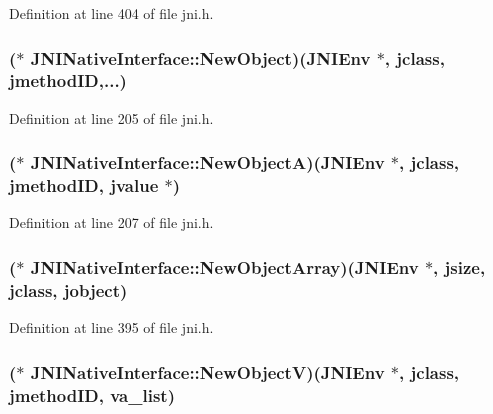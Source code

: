 Definition at line 404 of file jni.\-h.

\hypertarget{struct_j_n_i_native_interface_a043391953e574a3005c6752d7a824507}{
\subsubsection[{New\-Object}]{($\ast$ J\-N\-I\-Native\-Interface\-::\-New\-Object)({\bf J\-N\-I\-Env} $\ast$, {\bf jclass}, {\bf jmethod\-I\-D},...)}}\label{struct_j_n_i_native_interface_a043391953e574a3005c6752d7a824507}


Definition at line 205 of file jni.\-h.

\hypertarget{struct_j_n_i_native_interface_adb8f64ce37cc601b10a500246ac3cac0}{
\subsubsection[{New\-Object\-A}]{($\ast$ J\-N\-I\-Native\-Interface\-::\-New\-Object\-A)({\bf J\-N\-I\-Env} $\ast$, {\bf jclass}, {\bf jmethod\-I\-D}, {\bf jvalue} $\ast$)}}\label{struct_j_n_i_native_interface_adb8f64ce37cc601b10a500246ac3cac0}


Definition at line 207 of file jni.\-h.

\hypertarget{struct_j_n_i_native_interface_a999f73c938e06c510159ccd5df852d77}{
\subsubsection[{New\-Object\-Array}]{($\ast$ J\-N\-I\-Native\-Interface\-::\-New\-Object\-Array)({\bf J\-N\-I\-Env} $\ast$, {\bf jsize}, {\bf jclass}, {\bf jobject})}}\label{struct_j_n_i_native_interface_a999f73c938e06c510159ccd5df852d77}


Definition at line 395 of file jni.\-h.

\hypertarget{struct_j_n_i_native_interface_a461f535796a608f2ef1525b8042923e3}{
\subsubsection[{New\-Object\-V}]{($\ast$ J\-N\-I\-Native\-Interface\-::\-New\-Object\-V)({\bf J\-N\-I\-Env} $\ast$, {\bf jclass}, {\bf jmethod\-I\-D}, va\-\_\-list)}}\label{struct_j_n_i_native_interface_a461f535796a608f2ef1525b8042923e3}


